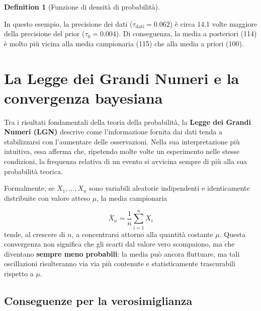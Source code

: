 \documentclass[
  letterpaper,
  DIV=11,
  numbers=noendperiod,
  oneside]{scrreprt}
\theoremstyle{definition}
\theoremstyle{plain}
\theoremstyle{definition}
\newtheorem{definition}{Definition}[chapter]
\theoremstyle{remark}
\begin{document}
\begin{definition}[Funzione di densità di
probabilità]
\begin{tcolorbox}[enhanced jigsaw, arc=.35mm, breakable, colbacktitle=quarto-callout-note-color!10!white, opacityback=0, toprule=.15mm, rightrule=.15mm, colback=white, opacitybacktitle=0.6, leftrule=.75mm, coltitle=black, bottomtitle=1mm, left=2mm, toptitle=1mm, title=\textcolor{quarto-callout-note-color}{\faInfo}\hspace{0.5em}{Il peso relativo di prior e dati}, titlerule=0mm, bottomrule=.15mm, colframe=quarto-callout-note-color-frame]

In questo esempio, la precisione dei dati
(\(\tau_{\text{dati}} = 0.062\)) è circa 14.1 volte maggiore della
precisione del prior (\(\tau_0 = 0.004\)). Di conseguenza, la media a
posteriori (114) è molto più vicina alla media campionaria (115) che
alla media a priori (100).

\end{tcolorbox}

\section{La Legge dei Grandi Numeri e la convergenza
bayesiana}\label{la-legge-dei-grandi-numeri-e-la-convergenza-bayesiana}

Tra i risultati fondamentali della teoria della probabilità, la
\textbf{Legge dei Grandi Numeri (LGN)} descrive come l'informazione
fornita dai dati tenda a stabilizzarsi con l'aumentare delle
osservazioni. Nella sua interpretazione più intuitiva, essa afferma che,
ripetendo molte volte un esperimento nelle stesse condizioni, la
frequenza relativa di un evento si avvicina sempre di più alla sua
probabilità teorica.

Formalmente, se \(X_1, \dots, X_n\) sono variabili aleatorie
indipendenti e identicamente distribuite con valore atteso \(\mu\), la
media campionaria

\[
\bar X_n = \frac{1}{n}\sum_{i=1}^{n} X_i
\] tende, al crescere di \(n\), a concentrarsi attorno alla quantità
costante \(\mu\). Questa convergenza non significa che gli scarti dal
valore vero scompaiono, ma che diventano \textbf{sempre meno probabili}:
la media può ancora fluttuare, ma tali oscillazioni risulteranno via via
più contenute e statisticamente trascurabili rispetto a \(\mu\).

\subsection{Conseguenze per la
verosimiglianza}\label{conseguenze-per-la-verosimiglianza}


\end{definition}
\end{document}
